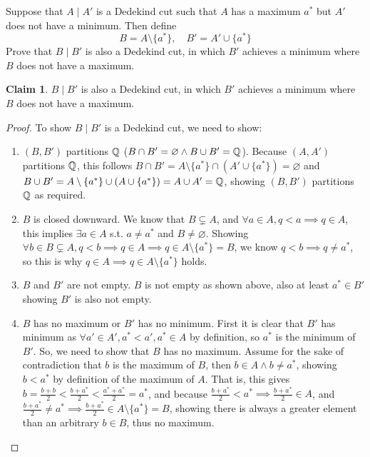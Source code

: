 \documentclass{homework}
\newcommand{\Q}{\bb{Q}} %
\newcommand{\?}{\stackrel{?}{=}}
\theoremstyle{definition}
\newtheorem*{claim}{Claim}
\begin{document}
\question[2] Suppose that $A\mid A'$ is a Dedekind cut such that $A$ has a maximum $a^*$ but $A'$ does not have a minimum. Then define $$B=A\setminus\{a^*\},\quad B'=A'\cup\{a^*\}$$ Prove that $B\mid B'$ is also a Dedekind cut, in which $B'$ achieves a minimum where $B$ does not have a maximum. 
\begin{claim}
    $B\mid B'$ is also a Dedekind cut, in which $B'$ achieves a minimum where $B$ does not have a maximum.
\end{claim}
\begin{proof}
    To show $B\mid B'$ is a Dedekind cut, we need to show:
    \begin{enumerate}
        \item $(B,B')$ partitions $\Q$ ($B\cap B'=\varnothing\land B\cup B'=\Q$).
Because $(A,A')$ partitions $\Q$, this follows $B\cap B'=A\setminus\{a^*\}\cap (A'\cup\{a^*\})=\varnothing$ and $B\cup B'=A\setminus\{a^*\}\cup(A\cup\{a^*\})=A\cup A'=\Q$, showing $(B,B')$ partitions $\Q$ as required.   
        \item $B$ is closed downward. 
We know that $B\subsetneq A$, and $\forall a\in A, q<a\implies q\in A$, this implies $\exists a\in A$ s.t. $a\neq a^*$ and $B\neq\varnothing$. Showing $\forall b\in B\subsetneq A, q<b\implies q\in A\implies q\in A\setminus\{a^*\}=B$, we know $q<b\implies q\neq a^*$, so this is why $q\in A\implies q\in A\setminus\{a^*\}$ holds. 
        \item $B$ and $B'$ are not empty.
$B$ is not empty as shown above, also at least $a^*\in B'$ showing $B'$ is also not empty.
        \item $B$ has no maximum or $B'$ has no minimum.
First it is clear that $B'$ has minimum as $\forall a'\in A', a^*<a', a^*\in A$ by definition, so $a^*$ is the minimum of $B'$. So, we need to show that $B$ has no maximum. Assume for the sake of contradiction that $b$ is the maximum of $B$, then $b\in A\land b\neq a^*$, showing $b<a^*$ by definition of the maximum of $A$. That is, this gives $b=\frac{b+b}{2}<\frac{b+a^*}{2}<\frac{a^*+a^*}{2}=a^*$, and because $\frac{b+a^*}{2}<a^*\implies \frac{b+a^*}{2}\in A$, and $\frac{b+a^*}{2}\neq a^*\implies \frac{b+a^*}{2}\in A\setminus\{a^*\}=B$, showing there is always a greater element than an arbitrary $b\in B$, thus no maximum.  
    \end{enumerate}
\end{proof}
\end{document}
